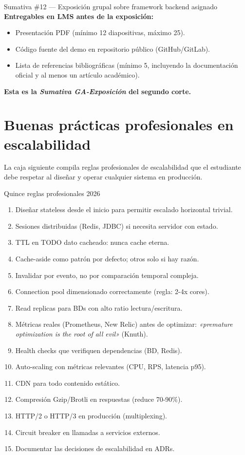 \documentclass[11pt,a4paper,openany]{book}
\begin{document}
\begin{cajaejercicio}{Sumativa \#12 --- Exposición grupal sobre framework backend asignado}
\textbf{Entregables en LMS antes de la exposición:}
\begin{itemize}
\item Presentación PDF (mínimo 12 diapositivas, máximo 25).
\item Código fuente del demo en repositorio público (GitHub/GitLab).
\item Lista de referencias bibliográficas (mínimo 5, incluyendo la
documentación oficial y al menos un artículo académico).
\end{itemize}

\textbf{Esta es la \emph{Sumativa GA-Exposición} del segundo corte.}
\end{cajaejercicio}

\section{Buenas prácticas profesionales en escalabilidad}

La caja siguiente compila reglas profesionales de
escalabilidad que el estudiante debe respetar al diseñar y operar
cualquier sistema en producción.


\begin{cajabuenas}{Quince reglas profesionales 2026}
\begin{enumerate}
\item Diseñar stateless desde el inicio para permitir escalado
horizontal trivial.
\item Sesiones distribuidas (Redis, JDBC) si necesita servidor con
estado.
\item TTL en TODO dato cacheado: nunca cache eterna.
\item Cache-aside como patrón por defecto; otros solo si hay razón.
\item Invalidar por evento, no por comparación temporal compleja.
\item Connection pool dimensionado correctamente (regla: 2-4x cores).
\item Read replicas para BDs con alto ratio lectura/escritura.
\item Métricas reales (Prometheus, New Relic) antes de optimizar:
\emph{«premature optimization is the root of all evil»} (Knuth).
\item Health checks que verifiquen dependencias (BD, Redis).
\item Auto-scaling con métricas relevantes (CPU, RPS, latencia p95).
\item CDN para todo contenido estático.
\item Compresión Gzip/Brotli en respuestas (reduce 70-90\%).
\item HTTP/2 o HTTP/3 en producción (multiplexing).
\item Circuit breaker en llamadas a servicios externos.
\item Documentar las decisiones de escalabilidad en ADRs.
\end{enumerate}
\end{cajabuenas}
\end{document}
